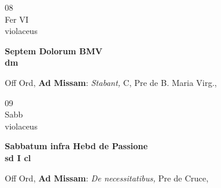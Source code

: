 \documentclass[10pt, openany]{book}
\begin{document}
        \begin{center}
            \begin{minipage}{3.5in}
                \vspace{2em}
                \begin{minipage}{0.5in}
                    {\Huge 08} \\
                    {\normalsize Fer VI} \\
                    {\normalsize violaceus}
                \end{minipage}
                \begin{minipage}{3.0in}
                    \textbf{ \large Septem Dolorum BMV \\
                    \textnormal{\normalsize dm}} \\ 
                \end{minipage}
                \begin{justify}Off Ord, \textbf{Ad Missam}: \textit{Stabant,} C, Pre de B. Maria Virg.,   
                \end{justify}
            \end{minipage}
        \end{center}
    
        \begin{center}
            \begin{minipage}{3.5in}
                \vspace{2em}
                \begin{minipage}{0.5in}
                    {\Huge 09} \\
                    {\normalsize Sabb} \\
                    {\normalsize violaceus}
                \end{minipage}
                \begin{minipage}{3.0in}
                    \textbf{ \large Sabbatum infra Hebd de Passione \\
                    \textnormal{\normalsize sd I cl}} \\ 
                \end{minipage}
                \begin{justify}Off Ord, \textbf{Ad Missam}: \textit{De necessitatibus,} Pre de Cruce,   
                \end{justify}
            \end{minipage}
        \end{center}
    
\end{document}
